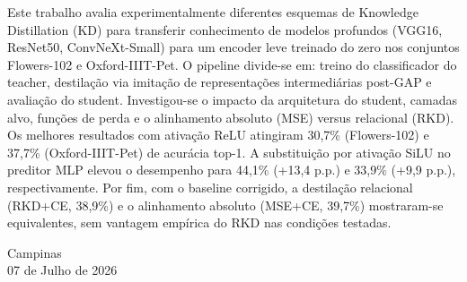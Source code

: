 \documentclass[
  article,            %
  11pt,               %
  letterpaper,        %
  oneside,            %
  sumario = tradicional
]{abntex2}
\begin{document}



\data{}

\makeatletter
\renewcommand{\posttitle}{%
  \arg@ifnotempty{\titleinanotherlanguage}{%
    \vskip\baselineskip%
    \itshape\titleinanotherlanguage%
  }%
  \end{center}%
  \vskip 0pt%
}
\makeatother

\begin{paginadetitulo}

\begin{ambienteresumo}
Este trabalho avalia experimentalmente diferentes esquemas de Knowledge Distillation (KD) para transferir conhecimento de modelos profundos (VGG16, ResNet50, ConvNeXt-Small) para um encoder leve treinado do zero nos conjuntos Flowers-102 e Oxford-IIIT-Pet. O pipeline divide-se em: treino do classificador do teacher, destilação via imitação de representações intermediárias post-GAP e avaliação do student. Investigou-se o impacto da arquitetura do student, camadas alvo, funções de perda e o alinhamento absoluto (MSE) versus relacional (RKD). Os melhores resultados com ativação ReLU atingiram 30,7\% (Flowers-102) e 37,7\% (Oxford-IIIT-Pet) de acurácia top-1. A substituição por ativação SiLU no preditor MLP elevou o desempenho para 44,1\% (+13,4 p.p.) e 33,9\% (+9,9 p.p.), respectivamente. Por fim, com o baseline corrigido, a destilação relacional (RKD+CE, 38,9\%) e o alinhamento absoluto (MSE+CE, 39,7\%) mostraram-se equivalentes, sem vantagem empírica do RKD nas condições testadas.

\end{ambienteresumo}

\vfill
\begin{center}
    Campinas \\
    07 de Julho de 2026
\end{center}

\end{paginadetitulo}
\newpage
\end{document}
